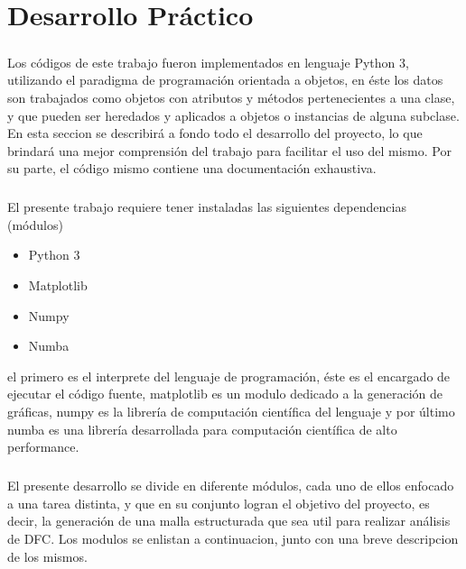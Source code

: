 \documentclass[letterpaper, openright, 12pt]{book}
\begin{document}
\chapter{Desarrollo Práctico}
    \paragraph*{}
    Los códigos de este trabajo fueron implementados en lenguaje Python 3,
    utilizando el paradigma de programación orientada a objetos, en éste los
    datos son trabajados como objetos con atributos y métodos pertenecientes
    a una clase, y que pueden ser heredados y aplicados a objetos o
    instancias de alguna subclase. En esta seccion se describirá a fondo todo
    el desarrollo del proyecto, lo que brindará una mejor comprensión del
    trabajo para facilitar el uso del mismo. Por su parte, el código mismo
    contiene una documentación exhaustiva.

    \paragraph*{}
    El presente trabajo requiere tener instaladas las siguientes dependencias
    (módulos)
    \begin{itemize}
        \item Python 3
        \item Matplotlib
        \item Numpy
        \item Numba
    \end{itemize}
    el primero es el interprete del lenguaje de programación, éste es el
    encargado de ejecutar el código fuente, matplotlib es un modulo dedicado
    a la generación de gráficas, numpy es la librería de computación
    científica del lenguaje y por último numba es una librería desarrollada
    para computación científica de alto performance.

    \paragraph*{}
    El presente desarrollo se divide en diferente módulos, cada uno de ellos
    enfocado a una tarea distinta, y que en su conjunto logran el objetivo del
    proyecto, es decir, la generación de una malla estructurada que sea util
    para realizar análisis de DFC\@. Los modulos se enlistan a continuacion,
    junto con una breve descripcion de los mismos.
\end{document}
